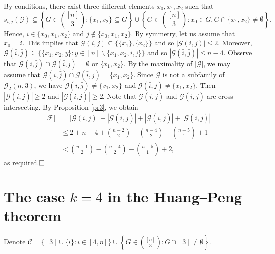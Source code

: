 \documentclass[11pt]{article}
\numberwithin{equation}{section}
\begin{document}
By conditions, there exist three different elements $x_0, x_1, x_2$ such that
$$
s_{i, j}(\mathcal{G})\subseteq \left\{G \in\binom{[n]}{3}: \{x_1,x_2\} \subseteq G\right\} \cup\left\{G \in\binom{[n]}{3}: x_0 \in G, G \cap \{x_1,x_2\} \neq \emptyset\right\}.
$$
Hence, $i\in \{x_0, x_1, x_2\}$ and $j\notin \{x_0, x_1, x_2\}$. By symmetry, let us assume that $x_0=i$. This implies that $\mathcal{G}(i,j)\subseteq \{\{x_1\}, \{x_2\}\}$ and so $|\mathcal{G}(i,j)|\leq 2$.
Moreover, $\mathcal{G}(\bar{i},\bar{j})\subseteq \{\{x_1, x_2, y\}: y\in [n]\backslash\{x_1, x_2, i, j\}\}$ and so $|\mathcal{G}(\bar{i},\bar{j})|\leq n-4$.
Observe that $\mathcal{G}(i,\bar{j})\cap \mathcal{G}(\bar{i},j)=\emptyset \text{ or } \{x_1, x_2\}$.
By the maximality of $|\mathcal{G}|$, we may assume that $\mathcal{G}(i,\bar{j})\cap \mathcal{G}(\bar{i},j)=\{x_1, x_2\}$.
Since $\mathcal{G}$ is not a subfamily of $\mathcal{G}_2(n, 3)$, we have
$\mathcal{G}(i,\bar{j})\neq \{x_1, x_2\}$ and $\mathcal{G}(\bar{i},j)\neq  \{x_1, x_2\}$.
Then  $|\mathcal{G}(i,\bar{j})|\geq 2$ and $|\mathcal{G}(\bar{i},j)|\geq 2$.  Note that $\mathcal{G}(i,\bar{j})$ and $\mathcal{G}(\bar{i},j)$ are cross-intersecting. By Proposition \ref{pr3}, we obtain
\begin{align*}
|\mathcal{F}| &=|\mathcal{G}(i,j)|+|\mathcal{G}(\bar{i},\bar{j})|+|\mathcal{G}(i,\bar{j})|+|\mathcal{G}(\bar{i}, j)| \\ 
& \leq 2+n-4+\binom{n-2}{2}-\binom{n-4}{2}-\binom{n-5}{1}+1\\
&<\binom{n-1}{2}-\binom{n-4}{2}-\binom{n-5}{1}+2,
\end{align*}
as required.$\hfill \square$\vspace{3mm}


\section{The case $k=4$ in the Huang--Peng theorem}

\label{App-B}

Denote $
\mathcal{C}=\{[3] \cup\{i\}: i \in[4, n]\}\cup\left\{G \in\binom{[n]}{3}:  G\cap [3]\neq \emptyset\right\}.$

\end{document}
